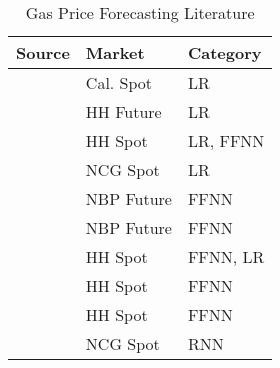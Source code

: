 \begin{table}[H]
	\begin{center}
			\begin{tabular}{l | l | l}
		 		Source & Market &  Category \\
				\hline
				\cite{woo_market_2006} &  Cal. Spot  &LR \\
				\cite{mu_weather_2007} &  HH Future  &LR \\
				\cite{malliaris_forecasting_2008} &  HH Spot  &LR, FFNN \\
				\cite{nick_what_2014} &  NCG Spot  &LR \\				
				\cite{nguyen_combining_2008} &  NBP Future  &FFNN \\
				\cite{nguyen_short-term_2010} &  NBP Future  &FFNN \\		
				\cite{abrishami_different_2011} &  HH Spot  &FFNN, LR \\
				\cite{panella_forecasting_2012} & HH Spot  & FFNN \\
				\cite{salehnia_forecasting_2013} & HH Spot  & FFNN \\
				\cite{busse_forecasting_2012} &  NCG Spot  & RNN \\	
			\end{tabular}
	\end{center}
	\caption{Gas Price Forecasting Literature}
	\label{tab:gas_lit}
\end{table}
